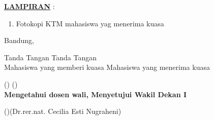 \documentclass[12pt]{letter}
\begin{document}
{\textbf{\underline{LAMPIRAN}} :
\begin{enumerate}
	\item Fotokopi KTM mahasiswa yag menerima kuasa
\end{enumerate}

		\begin{flushright}
			Bandung, 
		\end{flushright}
Tanda Tangan \hspace{7.3cm}Tanda Tangan \\
Mahasiswa yang memberi kuasa \hspace{4cm} Mahasiswa yang menerima kuasa \\
\begin{flushright}
		\end{flushright}
			\vspace{1cm}

	()\hspace{4.6cm} ()\\

	\textbf{Mengetahui dosen wali, \hspace{4.8cm} Menyetujui Wakil Dekan I}
	\vspace{2cm}

	()\hspace{4.8cm}(Dr.rer.nat. Cecilia Esti Nugraheni)
	\thispagestyle{empty}
		\newpage

}
\end{document}
